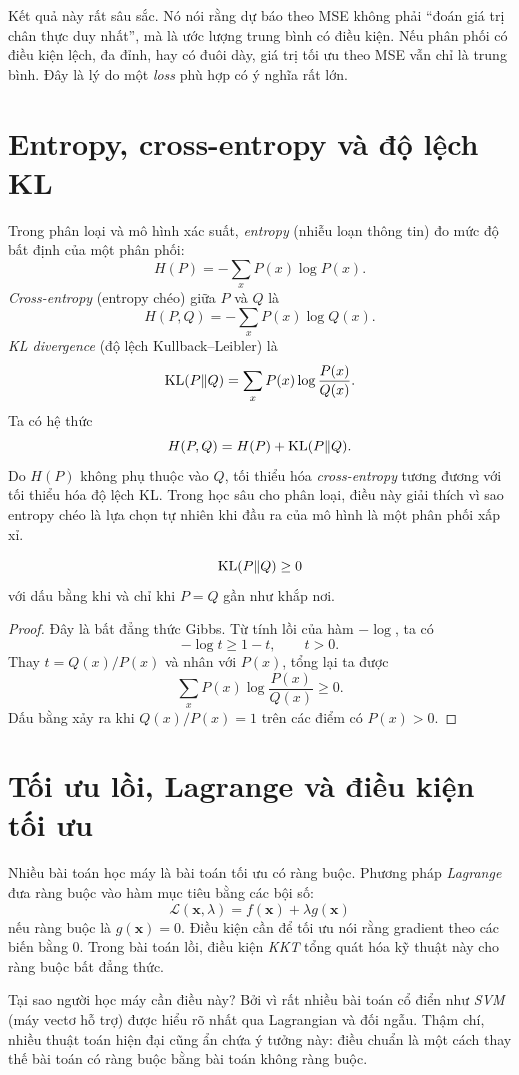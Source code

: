 Kết quả này rất sâu sắc. Nó nói rằng dự báo theo MSE không phải ``đoán giá trị chân thực duy nhất'', mà là ước lượng trung bình có điều kiện. Nếu phân phối có điều kiện lệch, đa đỉnh, hay có đuôi dày, giá trị tối ưu theo MSE vẫn chỉ là trung bình. Đây là lý do một \emph{loss} phù hợp có ý nghĩa rất lớn.

\section{Entropy, cross-entropy và độ lệch KL}

Trong phân loại và mô hình xác suất, \emph{entropy} (nhiễu loạn thông tin) đo mức độ bất định của một phân phối:
\[
H(P) = -\sum_x P(x)\log P(x).
\]
\emph{Cross-entropy} (entropy chéo) giữa $P$ và $Q$ là
\[
H(P,Q) = -\sum_x P(x)\log Q(x).
\]
\emph{KL divergence} (độ lệch Kullback--Leibler) là
\[
\mathrm{KL}(P\|Q)=\sum_x P(x)\log \frac{P(x)}{Q(x)}.
\]
Ta có hệ thức
\[
H(P,Q)=H(P)+\mathrm{KL}(P\|Q).
\]
Do $H(P)$ không phụ thuộc vào $Q$, tối thiểu hóa \emph{cross-entropy} tương đương với tối thiểu hóa độ lệch KL. Trong học sâu cho phân loại, điều này giải thích vì sao entropy chéo là lựa chọn tự nhiên khi đầu ra của mô hình là một phân phối xấp xỉ.

\begin{proposition}
\[
\mathrm{KL}(P\|Q)\ge 0
\]
với dấu bằng khi và chỉ khi $P=Q$ gần như khắp nơi.
\end{proposition}

\begin{proof}
Đây là bất đẳng thức Gibbs. Từ tính lồi của hàm $-\log$, ta có
\[
-\log t \ge 1-t,\qquad t>0.
\]
Thay $t=Q(x)/P(x)$ và nhân với $P(x)$, tổng lại ta được
\[
\sum_x P(x)\log \frac{P(x)}{Q(x)} \ge 0.
\]
Dấu bằng xảy ra khi $Q(x)/P(x)=1$ trên các điểm có $P(x)>0$.
\end{proof}

\section{Tối ưu lồi, Lagrange và điều kiện tối ưu}

Nhiều bài toán học máy là bài toán tối ưu có ràng buộc. Phương pháp \emph{Lagrange} đưa ràng buộc vào hàm mục tiêu bằng các bội số:
\[
\mathcal{L}(\bm{x},\lambda)=f(\bm{x})+\lambda g(\bm{x})
\]
nếu ràng buộc là $g(\bm{x})=0$. Điều kiện cần để tối ưu nói rằng gradient theo các biến bằng 0. Trong bài toán lồi, điều kiện \emph{KKT} tổng quát hóa kỹ thuật này cho ràng buộc bất đẳng thức.

Tại sao người học máy cần điều này? Bởi vì rất nhiều bài toán cổ điển như \emph{SVM} (máy vectơ hỗ trợ) được hiểu rõ nhất qua Lagrangian và đối ngẫu. Thậm chí, nhiều thuật toán hiện đại cũng ẩn chứa ý tưởng này: điều chuẩn là một cách thay thế bài toán có ràng buộc bằng bài toán không ràng buộc.


